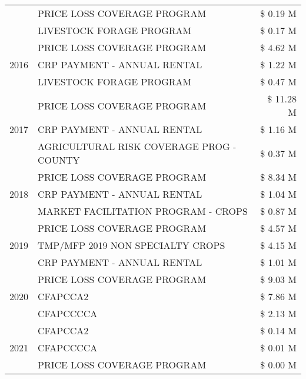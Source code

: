 \begin{tabular}{llr}
 & PRICE LOSS COVERAGE PROGRAM & \$ 0.19 M \\
 & LIVESTOCK FORAGE PROGRAM & \$ 0.17 M \\
\cline{1-3}
\multirow[t]{3}{*}{2016} & PRICE LOSS COVERAGE PROGRAM & \$ 4.62 M \\
 & CRP PAYMENT - ANNUAL RENTAL & \$ 1.22 M \\
 & LIVESTOCK FORAGE PROGRAM & \$ 0.47 M \\
\cline{1-3}
\multirow[t]{3}{*}{2017} & PRICE LOSS COVERAGE PROGRAM & \$ 11.28 M \\
 & CRP PAYMENT - ANNUAL RENTAL & \$ 1.16 M \\
 & AGRICULTURAL RISK COVERAGE PROG - COUNTY & \$ 0.37 M \\
\cline{1-3}
\multirow[t]{3}{*}{2018} & PRICE LOSS COVERAGE PROGRAM & \$ 8.34 M \\
 & CRP PAYMENT - ANNUAL RENTAL & \$ 1.04 M \\
 & MARKET FACILITATION PROGRAM - CROPS & \$ 0.87 M \\
\cline{1-3}
\multirow[t]{3}{*}{2019} & PRICE LOSS COVERAGE PROGRAM & \$ 4.57 M \\
 & TMP/MFP 2019 NON SPECIALTY CROPS & \$ 4.15 M \\
 & CRP PAYMENT - ANNUAL RENTAL & \$ 1.01 M \\
\cline{1-3}
\multirow[t]{3}{*}{2020} & PRICE LOSS COVERAGE PROGRAM & \$ 9.03 M \\
 & CFAPCCA2 & \$ 7.86 M \\
 & CFAPCCCCA & \$ 2.13 M \\
\cline{1-3}
\multirow[t]{3}{*}{2021} & CFAPCCA2 & \$ 0.14 M \\
 & CFAPCCCCA & \$ 0.01 M \\
 & PRICE LOSS COVERAGE PROGRAM & \$ 0.00 M \\
\cline{1-3}
\bottomrule
\end{tabular}
